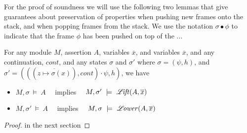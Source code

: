 For the proof of soundness we will use the following two lemmas that give guarantees about preservation of properties when pushing new frames onto the stack, and when popping frames from the stack. We use the notation $\sigma \bullet \phi$ to indicate that the frame $\phi$ has been pushed on top of the ...

 
\begin{lemma}
For any module $M$, assertion $A$, variables $\overline x$, and variables $\overline x$,  %
and any continuation, $cont$, and any states $\sigma$ and $\sigma'$ where 
$\sigma=(\psi,h)$, and $\sigma'=(((\overline {z \mapsto \sigma(x)}), cont)\cdot \psi, h)$,  
we have

\begin{itemize}
\item
$M,\sigma\ \models\  A$  \ \ implies \ \  $M,\sigma' \ \models\  {\mathcal{L}\!\mathit{ift}(A,\overline x)}   $
\item
$M,\sigma'\ \models\  A$  \ \ implies \ \  $M,\sigma  \ \models\  \llower  {A}  {\overline   x} $ 
\end{itemize}
\end{lemma}
\begin{proof}
in the next section
\end{proof}


 